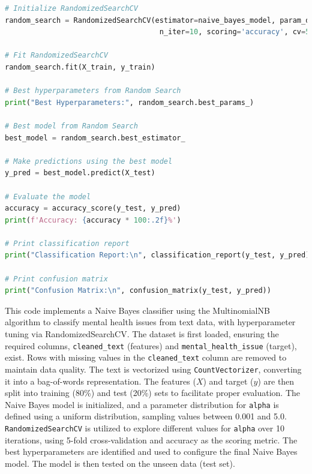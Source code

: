 \begin{tcolorbox}[colback=gray!5!white, colframe=gray!80!black, boxrule=0.5pt, title=Naive Bayes]
    \begin{lstlisting}[language=Python]
# Initialize RandomizedSearchCV
random_search = RandomizedSearchCV(estimator=naive_bayes_model, param_distributions=param_distributions,
                                    n_iter=10, scoring='accuracy', cv=5, n_jobs=-1, random_state=42)

# Fit RandomizedSearchCV
random_search.fit(X_train, y_train)

# Best hyperparameters from Random Search
print("Best Hyperparameters:", random_search.best_params_)

# Best model from Random Search
best_model = random_search.best_estimator_

# Make predictions using the best model
y_pred = best_model.predict(X_test)

# Evaluate the model
accuracy = accuracy_score(y_test, y_pred)
print(f'Accuracy: {accuracy * 100:.2f}%')

# Print classification report
print("Classification Report:\n", classification_report(y_test, y_pred))

# Print confusion matrix
print("Confusion Matrix:\n", confusion_matrix(y_test, y_pred))        
    \end{lstlisting}
\end{tcolorbox}

\noindent
This code implements a Naive Bayes classifier using the MultinomialNB algorithm to classify mental health issues from text data, with hyperparameter tuning via RandomizedSearchCV. The dataset is first loaded, ensuring the required columns, \texttt{cleaned\_text} (features) and \texttt{mental\_health\_issue} (target), exist. Rows with missing values in the \texttt{cleaned\_text} column are removed to maintain data quality. The text is vectorized using \texttt{CountVectorizer}, converting it into a bag-of-words representation. The features (\(X\)) and target (\(y\)) are then split into training (80\%) and test (20\%) sets to facilitate proper evaluation. The Naive Bayes model is initialized, and a parameter distribution for \texttt{alpha} is defined using a uniform distribution, sampling values between 0.001 and 5.0. \texttt{RandomizedSearchCV} is utilized to explore different values for \texttt{alpha} over 10 iterations, using 5-fold cross-validation and accuracy as the scoring metric. The best hyperparameters are identified and used to configure the final Naive Bayes model. The model is then tested on the unseen data (test set).


